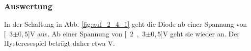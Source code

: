 \documentclass[12pt,a4paper]{article}
\begin{document}
\subsubsection*{Auswertung}
In der Schaltung in Abb. \ref{fig:auf_2_4_1} geht die Diode ab einer Spannung von \unit[3$\pm0,5$]{V} aus. Ab einer Spannung von \unit[2,3$\pm0,5$]{V} geht sie wieder an. Der Hysteresespiel beträgt daher etwa \unit[0,7]{V}.\newline
\end{document}
